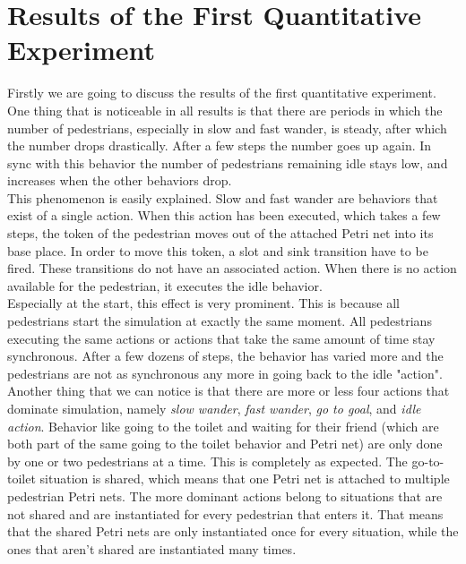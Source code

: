 \documentclass[11pt, a4paper]{book}
\begin{document}



\section{Results of the First Quantitative Experiment}
\label{sec:firstquantitative}
Firstly we are going to discuss the results of the first quantitative experiment. One thing that is noticeable in all results is that there are periods in which the number of pedestrians, especially in slow and fast wander, is steady, after which the number drops drastically. After a few steps the number goes up again. In sync with this behavior the number of pedestrians remaining idle stays low, and increases when the other behaviors drop.\\
This phenomenon is easily explained. Slow and fast wander are behaviors that exist of a single action. When this action has been executed, which takes a few steps, the token of the pedestrian moves out of the attached Petri net into its base place. In order to move this token, a slot and sink transition have to be fired. These transitions do not have an associated action. When there is no action available for the pedestrian, it executes the idle behavior.\\
Especially at the start, this effect is very prominent. This is because all pedestrians start the simulation at exactly the same moment. All pedestrians executing the same actions or actions that take the same amount of time stay synchronous. After a few dozens of steps, the behavior has varied more and the pedestrians are not as synchronous any more in going back to the idle "action".\\
Another thing that we can notice is that there are more or less four actions that dominate simulation, namely \emph{slow wander}, \emph{fast wander}, \emph{go to goal}, and \emph{idle action}.
Behavior like going to the toilet and waiting for their friend (which are both part of the same going to the toilet behavior and Petri net) are only done by one or two pedestrians at a time. This is completely as expected. The go-to-toilet situation is shared, which means that one Petri net is attached to multiple pedestrian Petri nets. The more dominant actions belong to situations that are not shared and are instantiated for every pedestrian that enters it. That means that the shared Petri nets are only instantiated once for every situation, while the ones that aren't shared are instantiated many times.
\end{document}
